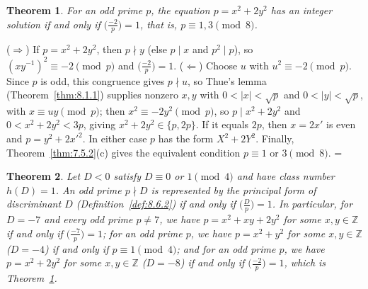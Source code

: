 \documentclass[11pt]{article}
\makeatletter
\theoremstyle{ntstyle}
\newtheorem{theorem}{Theorem}[subsection]
\let\nt@closedisplay\]
\def\nt@guardedclose{\@ifnextchar\par{\nt@closeafterpar}{\@ifnextchar\end{\postdisplaypenalty\@M\nt@closedisplay}{\nt@closedisplay}}}
\def\nt@closeafterpar\par{\@ifnextchar\par{\nt@closeafterpar}{\@ifnextchar\end{\postdisplaypenalty\@M\nt@closedisplay\par}{\nt@closedisplay\par}}}
\renewenvironment{proof}[1][\proofname]{\par
  \pushQED{\qed}\normalfont\topsep\medskipamount\edef\nt@afterproof{\@endparpenalty=\the\@endparpenalty\relax}\@beginparpenalty\@M\@endparpenalty\@M\let\]\nt@guardedclose\trivlist\item[]\textit{#1\@addpunct{.}} \ignorespaces}{\ifvmode\addpenalty\@M\fi\popQED\nt@afterproof\endtrivlist\@endpefalse}
\newcommand{\legs}[2]{\bigl(\tfrac{#1}{#2}\bigr)}
\makeatother
\begin{document}
\begin{theorem}\label{thm:8.6.4} For an
	odd prime $p$, the equation $p = x^2 + 2y^2$ has an integer solution
	if and only if $\legs{-2}{p} = 1$, that is, $p \equiv 1, 3 \pmod{8}$.
\end{theorem}

\begin{proof} ($\Rightarrow$) If $p = x^2 + 2y^2$, then $p
		\nmid y$ (else $p \mid x$ and $p^2 \mid p$), so $(xy^{-1})^2 \equiv
		-2 \pmod{p}$ and $\legs{-2}{p} = 1$. ($\Leftarrow$)
	Choose $u$ with $u^2 \equiv -2 \pmod{p}$. Since $p$ is odd, this
	congruence gives $p\nmid u$, so Thue's lemma
	(Theorem~\ref{thm:8.1.1}) supplies nonzero $x,y$ with
	$0<|x|<\sqrt{p}$ and $0<|y|<\sqrt{p}$, with
	$x \equiv u y \pmod{p}$; then $x^2 \equiv -2y^2 \pmod{p}$, so $p \mid
		x^2 + 2y^2$ and $0 < x^2 + 2y^2 < 3p$, giving $x^2 + 2y^2 \in \{p,
		2p\}$. If it equals $2p$, then $x = 2x'$ is even and $p = y^2 +
		2x'^2$. In either case $p$ has the form $X^2 + 2Y^2$. Finally,
	Theorem~\ref{thm:7.5.2}(c) gives the equivalent condition
	$p\equiv1$ or $3\pmod{8}$.
\end{proof}
\begin{theorem}\label{thm:8.6.5} Let $D < 0$ satisfy $D\equiv0$ or $1\pmod{4}$ and have class
	number $h(D) = 1$. An odd
	prime $p \nmid D$ is represented by the principal form of
	discriminant $D$ (Definition~\ref{def:8.6.2}) if and only if $\legs{D}{p} = 1$. In
	particular, for $D=-7$ and every odd prime $p\neq7$, we have
	$p=x^2+xy+2y^2$ for some $x,y\in\mathbb{Z}$ if and only if $\legs{-7}{p}=1$;
	for an odd prime $p$, we have $p = x^2 + y^2$ for some $x,y\in\mathbb{Z}$ ($D = -4$) if and only if $p \equiv 1
		\pmod{4}$; and for an odd prime $p$, we have $p = x^2 + 2y^2$ for some $x,y\in\mathbb{Z}$ ($D = -8$) if and
	only if $\legs{-2}{p} = 1$, which is Theorem~\ref{thm:8.6.4}.
\end{theorem}
\end{document}
